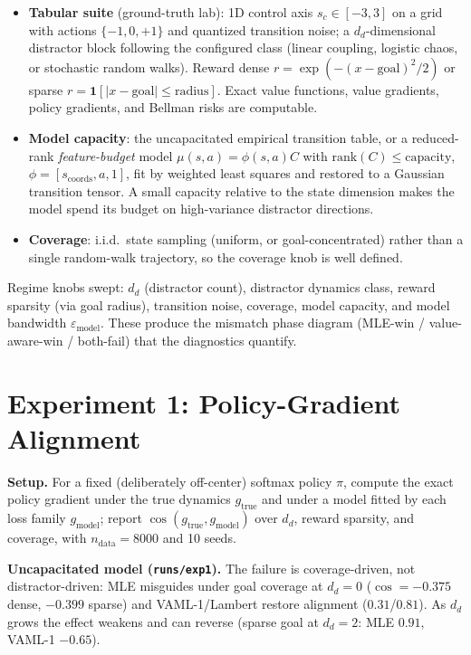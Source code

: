 \documentclass{article}
\theoremstyle{plain}
\begin{document}
\begin{itemize}
\item \textbf{Tabular suite} (ground-truth lab): 1D control axis $s_c \in [-3, 3]$ on a
  grid with actions $\{-1, 0, +1\}$ and quantized transition noise; a $d_d$-dimensional
  distractor block following the configured class (linear coupling, logistic chaos, or
  stochastic random walks). Reward dense
  $r = \exp\!\left(-(x - \mathrm{goal})^2/2\right)$ or sparse
  $r = \mathbf{1}[\lvert x - \mathrm{goal}\rvert \le \mathrm{radius}]$. Exact value
  functions, value gradients, policy gradients, and Bellman risks are computable.
\item \textbf{Model capacity}: the uncapacitated empirical transition table, or a
  reduced-rank \emph{feature-budget} model
  $\mu(s,a) = \phi(s,a) C$ with $\mathrm{rank}(C) \le \mathrm{capacity}$,
  $\phi = [s_{\text{coords}}, a, 1]$, fit by weighted least squares and restored to a
  Gaussian transition tensor. A small capacity relative to the state dimension makes the
  model spend its budget on high-variance distractor directions.
\item \textbf{Coverage}: i.i.d.\ state sampling (uniform, or goal-concentrated) rather
  than a single random-walk trajectory, so the coverage knob is well defined.
\end{itemize}

Regime knobs swept: $d_d$ (distractor count), distractor dynamics class, reward sparsity
(via goal radius), transition noise, coverage, model capacity, and model bandwidth
$\varepsilon_{\mathrm{model}}$. These produce the mismatch phase diagram
(MLE-win / value-aware-win / both-fail) that the diagnostics quantify.

\section{Experiment 1: Policy-Gradient Alignment}

\textbf{Setup.} For a fixed (deliberately off-center) softmax policy $\pi$, compute the
exact policy gradient under the true dynamics $g_{\text{true}}$ and under a model fitted
by each loss family $g_{\mathrm{model}}$; report
$\cos(g_{\text{true}}, g_{\mathrm{model}})$ over $d_d$, reward sparsity, and coverage,
with $n_{\text{data}} = 8000$ and 10 seeds.

\textbf{Uncapacitated model (\texttt{runs/exp1}).} The failure is coverage-driven, not
distractor-driven: MLE misguides under goal coverage at $d_d = 0$
($\cos = -0.375$ dense, $-0.399$ sparse) and VAML-1/Lambert restore alignment
($0.31$/$0.81$). As $d_d$ grows the effect weakens and can reverse (sparse goal at
$d_d = 2$: MLE $0.91$, VAML-1 $-0.65$).
\end{document}

